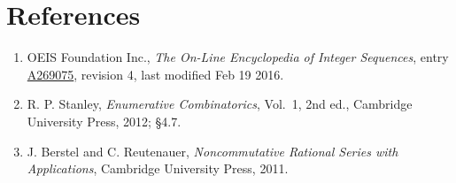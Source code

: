 \documentclass[11pt]{article}
\theoremstyle{definition}
\begin{document}
\section{References}

\begin{enumerate}

\item OEIS Foundation Inc., \emph{The On-Line Encyclopedia of Integer Sequences}, entry \href{https://oeis.org/A269075}{A269075}, revision 4, last modified Feb 19 2016.

\item R. P. Stanley, \emph{Enumerative Combinatorics}, Vol.~1, 2nd ed., Cambridge University Press, 2012; \S4.7.

\item J. Berstel and C. Reutenauer, \emph{Noncommutative Rational Series with Applications}, Cambridge University Press, 2011.

\end{enumerate}
\end{document}
